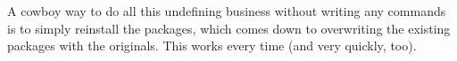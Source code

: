 \documentclass{book}
\theoremstyle{definition}
\begin{document}
A cowboy way to do all this undefining business without writing any commands is to simply reinstall the packages, which comes down to overwriting the existing packages with the originals. This works every time (and very quickly, too). 






















































































												










































\newpage
\end{document}

